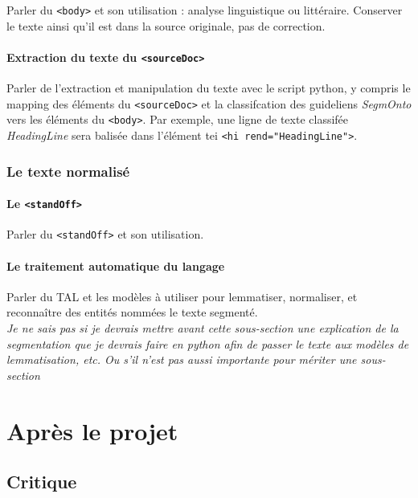 \documentclass[a4paper,12pt,twoside]{book}
\begin{document}
	Parler du \texttt{<body>} et son utilisation : analyse linguistique ou littéraire. Conserver le texte ainsi qu'il est dans la source originale, pas de correction.
	
	\subsection{Extraction du texte du \texttt{<sourceDoc>}}
	
	Parler de l'extraction et manipulation du texte avec le script python, y compris le mapping des éléments du \texttt{<sourceDoc>} et la classifcation des guideliens \textit{SegmOnto} vers les éléments du \texttt{<body>}. Par exemple, une ligne de texte classifée \textit{HeadingLine} sera balisée dans l'élément \acrshort{tei} \texttt{<hi rend="HeadingLine">}.
	
	\section{Le texte normalisé}
	
	\subsection{Le \texttt{<standOff>}}
	
	Parler du \texttt{<standOff>} et son utilisation.
	
	\subsection{Le traitement automatique du langage}
	
	Parler du TAL et les modèles à utiliser pour lemmatiser, normaliser, et reconnaître des entités nommées le texte segmenté.\\
	
\textit{Je ne sais pas si je devrais mettre avant cette sous-section une explication de la segmentation que je devrais faire en python afin de passer le texte aux modèles de lemmatisation, etc. Ou s'il n'est pas aussi importante pour mériter une sous-section}


	\part{Après le projet}
	
	\chapter{Critique}
	
\end{document}
